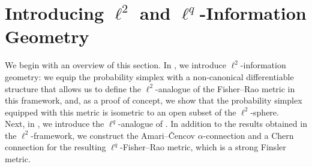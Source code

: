 \documentclass[12pt]{amsart}
\numberwithin{figure}{section}
\numberwithin{table}{section}
\numberwithin{equation}{section}
\begin{document}
\section{Introducing $\ell^2$ and $\ell^q$-Information Geometry}\label{s: 2}
We begin with an overview of this section. In , we introduce \(\ell^2\)-information geometry: we equip the probability simplex with a non-canonical differentiable structure that allows us to define the \(\ell^2\)-analogue of the Fisher--Rao metric in this framework, and, as a proof of concept, we show that the probability simplex equipped with this metric is isometric to an open subset of the \(\ell^2\)-sphere.\\
Next, in , we introduce the \(\ell^q\)-analogue of . In addition to the results obtained in the \(\ell^2\)-framework, we construct the Amari--\v{C}encov \(\alpha\)-connection and a Chern connection for the resulting \(\ell^q\)-Fisher--Rao metric, which is a strong Finsler metric.
\end{document}
